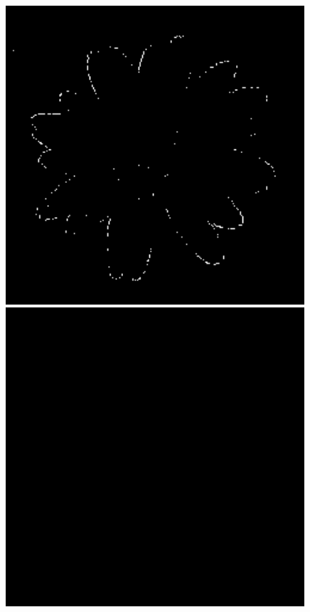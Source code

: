 \documentclass[a4paper]{report}
\begin{document}
\begin{figure}[H]
\begin{minipage}{.33\textwidth}
\end{minipage}%
\begin{minipage}{.33\textwidth}
  \centering
  \includegraphics[width=0.99\textwidth]{images/Canny/flower_Matlabedge_Roberts.png}
\end{minipage}
\begin{minipage}{.33\textwidth}
  \centering
    \includegraphics[width=0.99\textwidth]{images/Canny/flower_Matlabedge_Canny_1.2.png}

\end{minipage}
\end{figure}
\end{document}
